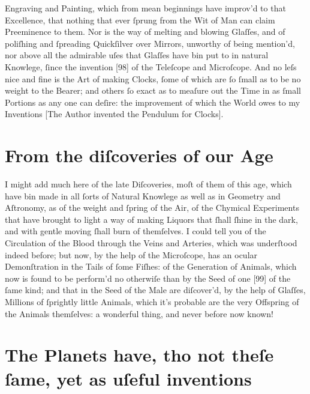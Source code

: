 \documentclass[letterpaper]{book}
\begin{document}
Engraving and Painting, which from mean beginnings have improv'd to that
Excellence, that nothing that ever ſprung from the Wit of Man can claim
Preeminence to them. Nor is the way of melting and blowing Glaſſes, and of
poliſhing and ſpreading Quickſilver over Mirrors, unworthy of being
mention'd, nor above all the admirable uſes that Glaſſes have bin put to in
natural Knowlege, ſince the invention [98] of the Teleſcope and Microſcope.
And no leſs nice and fine is the Art of making Clocks, ſome of which are ſo
ſmall as to be no weight to the Bearer; and others ſo exact as to meaſure
out the Time in as ſmall Portions as any one can deſire: the improvement of
which the World owes to my Inventions [The Author invented the Pendulum for
Clocks].


\section{From the diſcoveries of our Age}

I might add much here of the late Diſcoveries, moſt of them of this age,
which have bin made in all ſorts of Natural Knowlege as well as in Geometry
and Aſtronomy, as of the weight and ſpring of the Air, of the Chymical
Experiments that have brought to light a way of making Liquors that ſhall
ſhine in the dark, and with gentle moving ſhall burn of themſelves. I could
tell you of the Circulation of the Blood through the Veins and Arteries,
which was underſtood indeed before; but now, by the help of the Microſcope,
has an ocular Demonſtration in the Tails of ſome Fiſhes: of the Generation
of Animals, which now is found to be perform'd no otherwiſe than by the Seed
of one [99] of the ſame kind; and that in the Seed of the Male are
diſcover'd, by the help of Glaſſes, Millions of ſprightly little Animals,
which it's probable are the very Offspring of the Animals themſelves: a
wonderful thing, and never before now known!


\section{The Planets have, tho not theſe ſame, yet as uſeful inventions}
\end{document}
